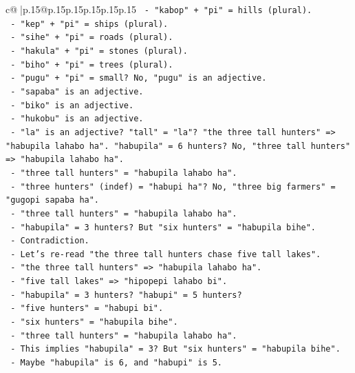 \documentclass{article}
\begin{document}
{\begin{supertabular}{c@{$\;$}|p{.15\linewidth}@{}p{.15\linewidth}p{.15\linewidth}p{.15\linewidth}p{.15\linewidth}p{.15\linewidth}}
{{{\texttt{       {-} "kabop" + "pi" = hills (plural).} \\
\texttt{       {-} "kep" + "pi" = ships (plural).} \\
\texttt{       {-} "sihe" + "pi" = roads (plural).} \\
\texttt{       {-} "hakula" + "pi" = stones (plural).} \\
\texttt{       {-} "biho" + "pi" = trees (plural).} \\
\texttt{       {-} "pugu" + "pi" = small? No, "pugu" is an adjective.} \\
\texttt{       {-} "sapaba" is an adjective.} \\
\texttt{       {-} "biko" is an adjective.} \\
\texttt{       {-} "hukobu" is an adjective.} \\
\texttt{       {-} "la" is an adjective? "tall" = "la"? "the three tall hunters" => "habupila lahabo ha". "habupila" = 6 hunters? No, "three tall hunters" => "habupila lahabo ha".} \\
\texttt{       {-} "three tall hunters" = "habupila lahabo ha".} \\
\texttt{       {-} "three hunters" (indef) = "habupi ha"? No, "three big farmers" = "gugopi sapaba ha".} \\
\texttt{       {-} "three tall hunters" = "habupila lahabo ha".} \\
\texttt{       {-} "habupila" = 3 hunters? But "six hunters" = "habupila bihe".} \\
\texttt{       {-} Contradiction.} \\
\texttt{       {-} Let's re{-}read "the three tall hunters chase five tall lakes".} \\
\texttt{       {-} "the three tall hunters" => "habupila lahabo ha".} \\
\texttt{       {-} "five tall lakes" => "hipopepi lahabo bi".} \\
\texttt{       {-} "habupila" = 3 hunters? "habupi" = 5 hunters?} \\
\texttt{       {-} "five hunters" = "habupi bi".} \\
\texttt{       {-} "six hunters" = "habupila bihe".} \\
\texttt{       {-} "three tall hunters" = "habupila lahabo ha".} \\
\texttt{       {-} This implies "habupila" = 3? But "six hunters" = "habupila bihe".} \\
\texttt{       {-} Maybe "habupila" is 6, and "habupi" is 5.} \\
}}}
\end{supertabular}}
\end{document}
